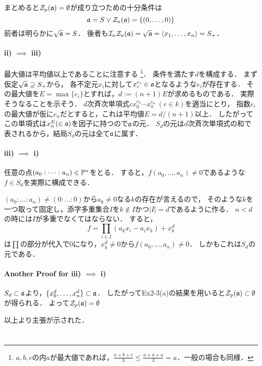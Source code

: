 \documentclass[a4paper]{jsarticle}
\begin{document}
    まとめると$\mathcal{Z}_p(\mathfrak{a})=\emptyset$が成り立つための十分条件は
    \[ \mathfrak{a}=S \lor \mathcal{Z}_a(\mathfrak{a})=\{(0,\dots,0)\} \]
    前者は明らかに$\sqrt{\mathfrak{a}}=S$．
    後者も$\mathcal{I}_a \mathcal{Z}_a(\mathfrak{a})=\sqrt{\mathfrak{a}}=\langle x_1,\dots,x_n \rangle=S_{+}$．

    \paragraph{ii) $\implies$ iii)}
    最大値は平均値以上であることに注意する
    \footnote{$a,b,c$の内$a$が最大値であれば，$\frac{a+b+c}{3} \leq \frac{a+a+a}{3}=a$．一般の場合も同様．}．
    条件を満たす$d$を構成する．
    まず仮定$\sqrt{\mathfrak{a}} \supseteq S_{+}$から，
    各不定元$x_i$に対して$x_i^{e_i} \in \mathfrak{a}$となるような$e_i$が存在する．
    その最大値を$E=\max\{e_i\}$とすれば，$d:=(n+1)E$が求めるものである．
    実際そうなることを示そう．
    $d$次斉次単項式$c x_0^{e_0} \cdots x_n^{e_n}~(c \in k)$を適当にとり，
    指数$e_i$の最大値が仮に$e_n$だとすると，これは平均値$E=d/(n+1)$以上．
    したがってこの単項式は$x_n^{E}(\in \mathfrak{a})$を因子に持つので$\mathfrak{a}$の元．
    $S_d$の元は$d$次斉次単項式の和で表されるから，結局$S_d$の元は全て$\mathfrak{a}$に属す．

    \paragraph{iii) $\implies$ i)}
    任意の点$(a_0: \dots: a_n) \in \mathbb{P}^n$をとる．
    すると，$f(a_0, \dots, a_n) \neq 0$であるような$f \in S_d$を実際に構成できる．

    $(a_0: \dots: a_n) \neq (0:\dots:0)$から$a_k \neq 0$なる$k$の存在が言えるので，
    そのような$k$を一つ取って固定し，添字多重集合$I$を$k \not \in I$かつ$|I|=d$であるように作る．
    $n < d$の時には$I$が多重でなくてはならない．
    すると，
    \[ f=\prod_{i \in I}(a_k x_i- a_i x_k) +x_k^d\]
    は$\prod$の部分が代入で0になり，$x_k^d \neq 0$から$f(a_0, \dots, a_n) \neq 0$．
    しかもこれは$S_d$の元である．

    \paragraph{Another Proof for iii) $\implies$ i)}
    $S_d \subset \mathfrak{a}$より，$\{x_0^d, \dots, x_n^d \} \subset \mathfrak{a}$．
    したがってEx2-3(a)の結果を用いると$\mathcal{Z}_p(\mathfrak{a}) \subset \emptyset$が得られる．
    よって$\mathcal{Z}_p(\mathfrak{a})=\emptyset$

    以上より主張が示された．

\section{ } %
\end{document}
